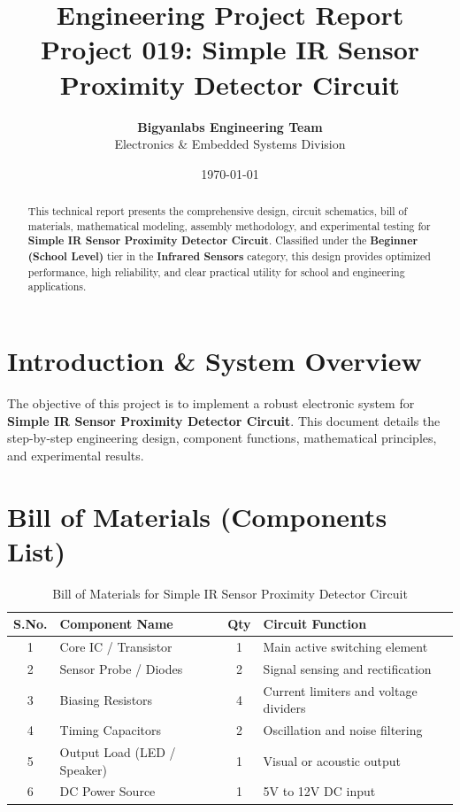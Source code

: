 \documentclass[11pt,a4paper]{article}
\title{\textbf{\Huge Engineering Project Report}\\[0.5em] \Large Project 019: Simple IR Sensor Proximity Detector Circuit}
\author{\textbf{Bigyanlabs Engineering Team}\\ Electronics \& Embedded Systems Division}
\date{\today}
\begin{document}
\maketitle
\thispagestyle{empty}

\begin{abstract}
This technical report presents the comprehensive design, circuit schematics, bill of materials, mathematical modeling, assembly methodology, and experimental testing for \textbf{Simple IR Sensor Proximity Detector Circuit}. Classified under the \textbf{Beginner (School Level)} tier in the \textbf{Infrared Sensors} category, this design provides optimized performance, high reliability, and clear practical utility for school and engineering applications.
\end{abstract}

\newpage
\tableofcontents
\newpage

\section{Introduction \& System Overview}
The objective of this project is to implement a robust electronic system for \textbf{Simple IR Sensor Proximity Detector Circuit}. This document details the step-by-step engineering design, component functions, mathematical principles, and experimental results.

\section{Bill of Materials (Components List)}
\begin{table}[h!]
\centering
\caption{Bill of Materials for Simple IR Sensor Proximity Detector Circuit}
\vspace{0.5em}
\begin{tabular}{clcp{7cm}}
\toprule
\textbf{S.No.} & \textbf{Component Name} & \textbf{Qty} & \textbf{Circuit Function} \\
\midrule
1 & Core IC / Transistor & 1 & Main active switching element \\
2 & Sensor Probe / Diodes & 2 & Signal sensing and rectification \\
3 & Biasing Resistors & 4 & Current limiters and voltage dividers \\
4 & Timing Capacitors & 2 & Oscillation and noise filtering \\
5 & Output Load (LED / Speaker) & 1 & Visual or acoustic output \\
6 & DC Power Source & 1 & 5V to 12V DC input \\
\bottomrule
\end{tabular}
\end{table}
\end{document}
